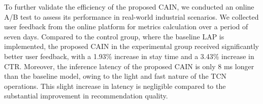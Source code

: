 To further validate the efficiency of the proposed CAIN, we conducted an online A/B test to assess its performance in real-world industrial scenarios. We collected user feedback from the online platform for metrics calculation over a period of seven days. Compared to the control group, where the baseline LAP is implemented, the proposed CAIN in the experimental group received significantly better user feedback, with a 1.93\% increase in stay time and a 3.43\% increase in CTR. Moreover, the inference latency of the proposed CAIN is only 8 ms longer than the baseline model, owing to the light and fast nature of the TCN operations. This slight increase in latency is negligible compared to the substantial improvement in recommendation quality. 